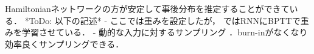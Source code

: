 Hamiltonianネットワークの方が安定して事後分布を推定することができている．
*ToDo: 以下の記述*
- ここでは重みを設定したが， \cite{Echeveste2020-sh}ではRNNにBPTTで重みを学習させている．
- 動的な入力に対するサンプリング \cite{Berkes2011-xj}．burn-inがなくなり効率良くサンプリングできる．